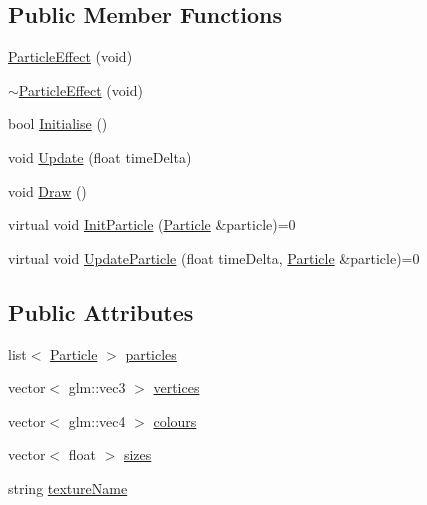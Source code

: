\subsection*{Public Member Functions}
\begin{DoxyCompactItemize}
\item 
\hyperlink{class_b_g_e_1_1_particle_effect_a35b44a90802ddda8de6ff69f7f15697a}{Particle\-Effect} (void)
\item 
\hyperlink{class_b_g_e_1_1_particle_effect_a556126ecdcdfb98bef0f555196b558ee}{$\sim$\-Particle\-Effect} (void)
\item 
bool \hyperlink{class_b_g_e_1_1_particle_effect_a5ffa1b90b928778feece079b8fb1c2f3}{Initialise} ()
\item 
void \hyperlink{class_b_g_e_1_1_particle_effect_a648e6935280975de113561bae6f92ee2}{Update} (float time\-Delta)
\item 
void \hyperlink{class_b_g_e_1_1_particle_effect_a03da78eeab938c06015894348e7256b1}{Draw} ()
\item 
virtual void \hyperlink{class_b_g_e_1_1_particle_effect_a4f091ccc1b7f567d9892ec66109d69ae}{Init\-Particle} (\hyperlink{class_particle}{Particle} \&particle)=0
\item 
virtual void \hyperlink{class_b_g_e_1_1_particle_effect_ab6d54b68b00011009c46409e6d2dec95}{Update\-Particle} (float time\-Delta, \hyperlink{class_particle}{Particle} \&particle)=0
\end{DoxyCompactItemize}
\subsection*{Public Attributes}
\begin{DoxyCompactItemize}
\item 
list$<$ \hyperlink{class_particle}{Particle} $>$ \hyperlink{class_b_g_e_1_1_particle_effect_a9c436e22c6519d585a99544c8c4f7a5d}{particles}
\item 
vector$<$ glm\-::vec3 $>$ \hyperlink{class_b_g_e_1_1_particle_effect_a2cd0cf7b9c82de0a3fadf4ffb0c98944}{vertices}
\item 
vector$<$ glm\-::vec4 $>$ \hyperlink{class_b_g_e_1_1_particle_effect_a8234e56d55c1c40507b8769b86aa3af7}{colours}
\item 
vector$<$ float $>$ \hyperlink{class_b_g_e_1_1_particle_effect_ae2034369c584704fd27592e481e94c5b}{sizes}
\item 
string \hyperlink{class_b_g_e_1_1_particle_effect_a7dbe5e230bce0d13d37d82c236188440}{texture\-Name}
\end{DoxyCompactItemize}


